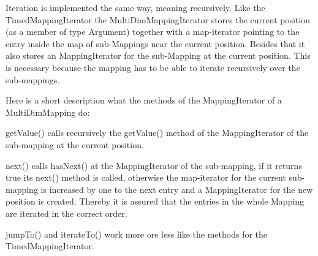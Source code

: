 Iteration is implemented the same way, meaning recursively. Like the
TimedMappingIterator the MultiDimMappingIterator stores the current position
(as a member of type Argument) together with a map-iterator pointing to the
entry inside the map of sub-Mappings near the current position.
Besides that it also stores an MappingIterator for the sub-Mapping at the
current position. This is necessary because the mapping has to be able to
iterate recursively over the sub-mappings.
\newline

Here is a short description what the methods of the MappingIterator of a
MultiDimMapping do:

\begin{description}
 \item getValue() calls recursively the getValue() method of the
MappingIterator of the sub-mapping at the current position.
 \item next() calls hasNext() at the MappingIterator of the
sub-mapping, if it returns true its next() method is called, otherwise the
map-iterator for the current sub-mapping is increased by one to the next
entry and a MappingIterator for the new position is created. Thereby it is
assured that the entries in the whole Mapping are iterated in the correct order.
\item jumpTo() and iterateTo() work more ore less like the methods for the
TimedMappingIterator.
\end{description}